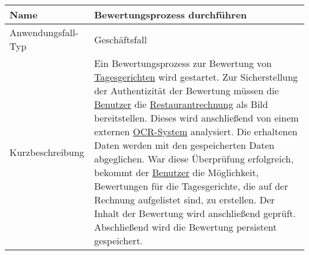 \begin{table}[H]
    \centering
    \label{bewertungsprozessDurchfuehren}
    \begin{tabularx}{\textwidth}{| l | X |}
        \hline
        Name               & Bewertungsprozess durchführen                                                                                                                                                                                                                                                                                                                                                                                                                                                                                                                                                                                                                                                                                                     \\
        \hline
        Anwendungsfall-Typ & Geschäftsfall                                                                                                                                                                                                                                                                                                                                                                                                                                                                                                                                                                                                                                                                                                                     \\
        \hline
        Kurzbeschreibung   & Ein Bewertungsprozess zur Bewertung von \hyperref[gls:tagesgericht]{Tagesgerichten} wird gestartet. Zur Sicherstellung der Authentizität der Bewertung müssen die \hyperref[gls:nutzer]{Benutzer} die \hyperref[gls:restaurantRechnung]{Restaurantrechnung} als Bild bereitstellen. Dieses wird anschließend von einem externen \hyperref[gls:ocr-System]{OCR-System} analysiert. Die erhaltenen Daten werden mit den gespeicherten Daten abgeglichen. War diese Überprüfung erfolgreich, bekommt der \hyperref[gls:nutzer]{Benutzer} die Möglichkeit, Bewertungen für die Tagesgerichte, die auf der Rechnung aufgelistet sind, zu erstellen. Der Inhalt der Bewertung wird anschließend geprüft. Abschließend wird die Bewertung persistent gespeichert. \\

\end{tabularx}
\end{table}
